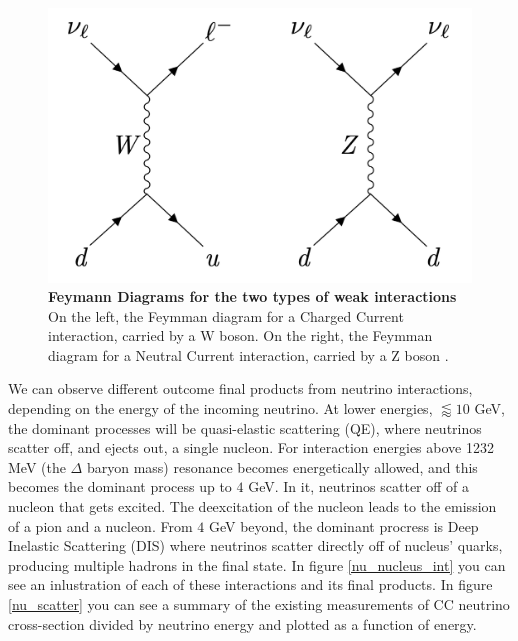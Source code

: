 \begin{figure}[h!]
	\begin{center}
		\includegraphics[scale=0.3]{Figures/feymann_diag.jpg}
		\caption[Feynman diagrams for the two types of weak interactions]{ {\textbf{Feymann Diagrams for the two types of weak interactions}} \\ On the left, the Feymman diagram for a Charged Current interaction, carried by a W boson. On the right, the Feymman diagram for a Neutral Current interaction, carried by a Z boson \cite{Lauren_thesis}.}
		\label{feymann_diag}	
	\end{center}
\end{figure}

We can observe different outcome final products from neutrino interactions, depending on the energy of the incoming neutrino. At lower energies, $\lessapprox 10$ GeV, the dominant processes will be quasi-elastic scattering (QE), where neutrinos scatter off, and ejects out, a single nucleon. For interaction energies above 1232 MeV (the $\Delta$ baryon mass) resonance becomes energetically allowed, and this becomes the dominant process up to $4$ GeV. In it, neutrinos scatter off of a nucleon that gets excited. The deexcitation of the nucleon leads to the emission of a pion and a nucleon. From $4$ GeV beyond, the dominant procress is Deep Inelastic Scattering (DIS) where neutrinos scatter directly off of nucleus' quarks, producing multiple hadrons in the final state. In figure \ref{nu_nucleus_int} you can see an inlustration of each of these interactions and its final products. In figure \ref{nu_scatter} you can see a summary of the existing measurements of CC neutrino cross-section divided by neutrino energy and plotted as a function of energy. 

